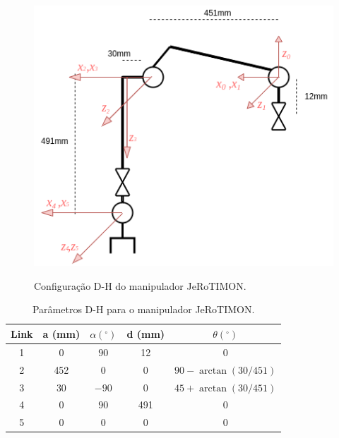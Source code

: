 \begin{figure}[H]
    \caption{Configuração D-H do manipulador JeRoTIMON.}
    \centering
    \includegraphics[scale=0.8]{images/dh_configuration.png}
    \label{fig:dh_config}
\end{figure}

\begin{table}[H]
    \caption{Parâmetros D-H para o manipulador JeRoTIMON.}
    \centering
    \begin{adjustbox}{max width=\textwidth}
    \begin{tabular}{|c|c|c|c|c|}
    \hline
    \rowcolor[HTML]{EFEFEF} 
    Link & a (mm) & $\alpha(^\circ) $ & d (mm) & $\theta(^\circ)$ \\ \hline
    1 & 0   & $90$ & 12  & 0                     \\ \hline
    \rowcolor[HTML]{EFEFEF} 
    2 & 452 & 0         & 0   & $90 - \arctan(30/451)$ \\ \hline
    3 & 30  & $-90$  & 0   & $45 + \arctan(30/451)$ \\ \hline
    \rowcolor[HTML]{EFEFEF} 
    4 & 0   & $90$   & 491 & 0                     \\ \hline
    5 & 0   & 0         & 0   & 0                     \\ \hline
    \end{tabular}
    \end{adjustbox}
    \label{tab:dh}
    \end{table}



